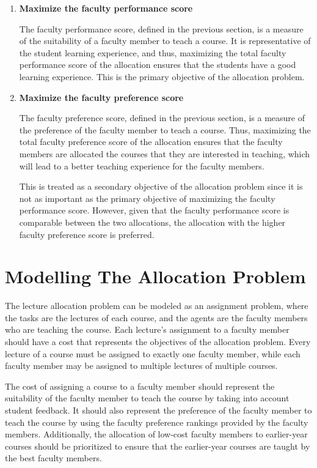 \begin{enumerate}
  \item \textbf{Maximize the faculty performance score}

        The faculty performance score, defined in the previous section, is a measure of the suitability of a faculty member to teach a course. It is representative of the student learning experience, and thus, maximizing the total faculty performance score of the allocation ensures that the students have a good learning experience. This is the primary objective of the allocation problem.

  \item \textbf{Maximize the faculty preference score}

        The faculty preference score, defined in the previous section, is a measure of the preference of the faculty member to teach a course. Thus, maximizing the total faculty preference score of the allocation ensures that the faculty members are allocated the courses that they are interested in teaching, which will lead to a better teaching experience for the faculty members.

        This is treated as a secondary objective of the allocation problem since it is not as important as the primary objective of maximizing the faculty performance score. However, given that the faculty performance score is comparable between the two allocations, the allocation with the higher faculty preference score is preferred.


\end{enumerate}

\section{Modelling The Allocation Problem}

The lecture allocation problem can be modeled as an assignment problem, where the tasks are the lectures of each course, and the agents are the faculty members who are teaching the course. Each lecture's assignment to a faculty member should have a cost that represents the objectives of the allocation problem. Every lecture of a course must be assigned to exactly one faculty member, while each faculty member may be assigned to multiple lectures of multiple courses.

The cost of assigning a course to a faculty member should represent the suitability of the faculty member to teach the course by taking into account student feedback. It should also represent the preference of the faculty member to teach the course by using the faculty preference rankings provided by the faculty members. Additionally, the allocation of low-cost faculty members to earlier-year courses should be prioritized to ensure that the earlier-year courses are taught by the best faculty members.

